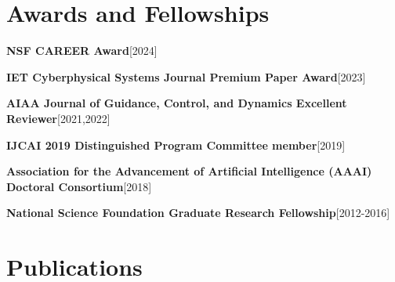\documentclass[10pt,roman]{moderncv}
\newcommand{\mycvitem}[2]{
    \textbf{#2}\hfill [#1]\break
}
\begin{document}
\section{Awards and Fellowships}

\mycvitem{2024}{NSF CAREER Award}
\mycvitem{2023}{IET Cyberphysical Systems Journal Premium Paper Award}
\mycvitem{2021,2022}{AIAA Journal of Guidance, Control, and Dynamics Excellent Reviewer}
\mycvitem{2019}{IJCAI 2019 Distinguished Program Committee member}
\mycvitem{2018}{Association for the Advancement of Artificial Intelligence (AAAI) Doctoral Consortium}
\mycvitem{2012-2016}{National Science Foundation Graduate Research Fellowship}


% 

\clearpage
\section{Publications}

\renewcommand{\thejnum}{J\arabic{jnum}}
\newcommand{\journal}[1]{\refstepcounter{jnum}\item[{[\thejnum]}] \fullcite{#1}\par\label{#1}}
\renewcommand{\thejcnum}{JC\arabic{jcnum}}
\newcommand{\jc}[1]{\refstepcounter{jcnum}\item[{[\thejcnum]}] \fullcite{#1}\par\label{#1}}
\renewcommand{\thecnum}{C\arabic{cnum}}
\newcommand{\conf}[1]{\refstepcounter{cnum}\item[{[\thecnum]}] \fullcite{#1}\par\label{#1}}
\renewcommand{\theonum}{A\arabic{onum}}
\newcommand{\opub}[1]{\refstepcounter{onum}\item[{[\theonum]}] \fullcite{#1}\par\label{#1}}
\renewcommand{\thepnum}{X\arabic{pnum}}
\newcommand{\inprep}[1]{\refstepcounter{pnum}\item[{[\thepnum]}] #1 \par}
\end{document}
